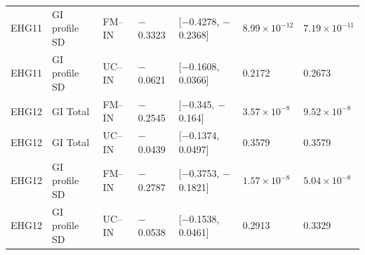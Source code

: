 \documentclass[10pt]{article}
\begin{document}
\begin{landscape}
\begin{longtable}{p{1.5cm}p{2.5cm}p{2.4cm}p{1.4cm}p{3.2cm}p{1.8cm}p{2.0cm}}
EHG11 & GI profile SD & FM--IN & $-$0.3323 & [$-$0.4278, $-$0.2368] & $8.99\times10^{-12}$ & $7.19\times10^{-11}$ \\
EHG11 & GI profile SD & UC--IN & $-$0.0621 & [$-$0.1608, 0.0366] & 0.2172 & 0.2673 \\
EHG12 & GI Total & FM--IN & $-$0.2545 & [$-$0.345, $-$0.164] & $3.57\times10^{-8}$ & $9.52\times10^{-8}$ \\
EHG12 & GI Total & UC--IN & $-$0.0439 & [$-$0.1374, 0.0497] & 0.3579 & 0.3579 \\
EHG12 & GI profile SD & FM--IN & $-$0.2787 & [$-$0.3753, $-$0.1821] & $1.57\times10^{-8}$ & $5.04\times10^{-8}$ \\
EHG12 & GI profile SD & UC--IN & $-$0.0538 & [$-$0.1538, 0.0461] & 0.2913 & 0.3329 \\
\bottomrule
\end{longtable}
\end{landscape}
\end{document}
